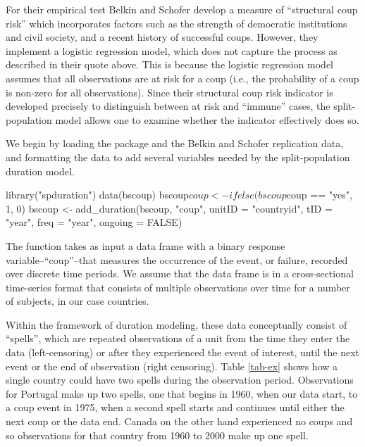 \documentclass[article]{jss}
\begin{document}
For their empirical test Belkin and Schofer develop a measure of
``structural coup risk'' which incorporates factors such as the strength
of democratic institutions and civil society, and a recent history of
successful coups. However, they implement a logistic regression model,
which does not capture the process as described in their quote above.
This is because the logistic regression model assumes that all
observations are at risk for a coup (i.e., the probability of a coup is
non-zero for all observations). Since their structural coup risk
indicator is developed precisely to distinguish between at risk and
``immune'' cases, the split-population model allows one to examine
whether the indicator effectively does so.

We begin by loading the package and the Belkin and Schofer replication
data, and formatting the data to add several variables needed by the
split-population duration model.

\begin{CodeInput}
library("spduration")
data(bscoup)
bscoup$coup <- ifelse(bscoup$coup == "yes", 1, 0)
bscoup      <- add_duration(bscoup, "coup", unitID = "countryid", tID = "year",
                            freq = "year", ongoing = FALSE)
\end{CodeInput}


The  function takes as input a data frame with a
binary response variable--``coup''--that measures the occurrence of the
event, or failure, recorded over discrete time periods. We assume that
the data frame is in a cross-sectional time-series format that consists
of multiple observations over time for a number of subjects, in our case
countries.

Within the framework of duration modeling, these data conceptually
consist of ``spells'', which are repeated observations of a unit from
the time they enter the data (left-censoring) or after they experienced
the event of interest, until the next event or the end of observation
(right censoring). Table \ref{tab-ex} shows how a single country could
have two spells during the observation period. Observations for Portugal
make up two spells, one that begins in 1960, when our data start, to a
coup event in 1975, when a second spell starts and continues until
either the next coup or the data end. Canada on the other hand
experienced no coups and so observations for that country from 1960 to
2000 make up one spell.
\end{document}
